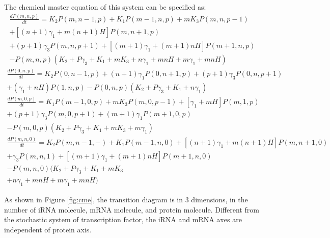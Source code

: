 \documentclass[fleqn,10pt]{wlscirep}
\begin{document}
The chemical master equation of this system can be specified as:
\begin{equation}
\begin{aligned}
\frac{dP(m,n,p)}{dt} = K_2P(m, n - 1, p) + K_1P(m - 1, n, p) + mK_3P(m, n, p - 1) \\ + [(n + 1)\gamma_1 + m(n + 1)H]P(m, n + 1, p)  \\ + (p + 1)\gamma_3P(m, n, p + 1) + [(m + 1)\gamma_1 + (m + 1)nH]P(m + 1, n, p)\\ - P(m, n, p)(K_2 + P\gamma_3 + K_1 + mK_3 + n\gamma_1 + mnH + m\gamma_1 + mnH)
\end{aligned}
\end{equation}
\begin{equation}
\begin{aligned}
\frac{dP(0,n,p)}{dt} = K_2P(0, n - 1, p) +  (n + 1)\gamma_1P(0, n + 1, p) + (p + 1)\gamma_3P(0, n, p + 1) \\+ (\gamma_1 + nH)P(1, n, p) - P(0, n, p)(K_2 + P\gamma_3 + K_1 + n\gamma_1)
\end{aligned}
\end{equation}
\begin{equation}
\begin{aligned}
\frac{dP(m,0,p)}{dt} = K_1P(m - 1, 0, p) + mK_3P(m, 0, p - 1) + [\gamma_1 + mH]P(m, 1, p) \\+ (p + 1)\gamma_3P(m, 0, p + 1) + (m + 1)\gamma_1P(m + 1, 0, p) \\- P(m, 0, p)(K_2 + P\gamma_3 + K_1 + mK_3 + m\gamma_1)
\end{aligned}
\end{equation}
\begin{equation}
\begin{aligned}
\frac{dP(m,n,0)}{dt} = K_2P(m, n - 1, -) + K_1P(m - 1, n, 0)+ [(n + 1)\gamma_1 + m(n + 1)H]P(m, n + 1, 0)\\ + \gamma_3P(m, n, 1) + [(m + 1)\gamma_1 + (m + 1)nH]P(m + 1, n, 0) \\- P(m, n, 0)(K_2 + P\gamma_3 + K_1 + mK_3 \\+ n\gamma_1 + mnH + m\gamma_1 + mnH)
\end{aligned}
\end{equation}

As shown in Figure \ref{fig:cme}, the transition diagram is in 3 dimensions, in the number of iRNA molecule, mRNA molecule, and protein molecule. Different from the stochastic system of transcription factor, the iRNA and mRNA axes are independent of protein axis.
\end{document}
